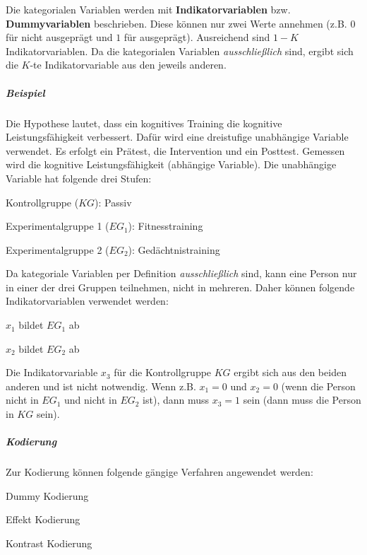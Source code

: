 \documentclass{article}
\numberwithin{equation}{section}
\begin{document}
Die kategorialen Variablen werden mit \textbf{Indikatorvariablen} bzw. \textbf{Dummyvariablen} beschrieben. Diese können nur zwei Werte annehmen (z.B. $0$ für nicht ausgeprägt und $1$ für ausgeprägt). Ausreichend sind ${1-K}$ Indikatorvariablen. Da die kategorialen Variablen \emph{ausschließlich} sind, ergibt sich die $K$-te Indikatorvariable aus den jeweils anderen.

\subparagraph{Beispiel}

Die Hypothese lautet, dass ein kognitives Training die kognitive Leistungsfähigkeit verbessert. Dafür wird eine dreistufige unabhängige Variable verwendet. Es erfolgt ein Prätest, die Intervention und ein Posttest. Gemessen wird die kognitive Leistungsfähigkeit (abhängige Variable). Die unabhängige Variable hat folgende drei Stufen:

\begin{compactitem}
\item Kontrollgruppe ($KG$): Passiv
\item Experimentalgruppe 1 ($EG_1$): Fitnesstraining
\item Experimentalgruppe 2 ($EG_2$): Gedächtnistraining
\end{compactitem}

Da kategoriale Variablen per Definition \emph{ausschließlich} sind, kann eine Person nur in einer der drei Gruppen teilnehmen, nicht in mehreren. Daher können folgende Indikatorvariablen verwendet werden:

\begin{compactitem}
\item $x_1$ bildet $EG_1$ ab
\item $x_2$ bildet $EG_2$ ab
\end{compactitem}

Die Indikatorvariable $x_3$ für die Kontrollgruppe $KG$ ergibt sich aus den beiden anderen und ist nicht notwendig. Wenn z.B. $x_1=0$ und $x_2=0$ (wenn die Person nicht in $EG_1$ und nicht in $EG_2$ ist), dann muss $x_3=1$ sein (dann muss die Person in $KG$ sein).

\subparagraph{Kodierung}

Zur Kodierung können folgende gängige Verfahren angewendet werden:

\begin{compactenum}
\item Dummy Kodierung
\item Effekt Kodierung
\item Kontrast Kodierung
\end{compactenum}
\end{document}
